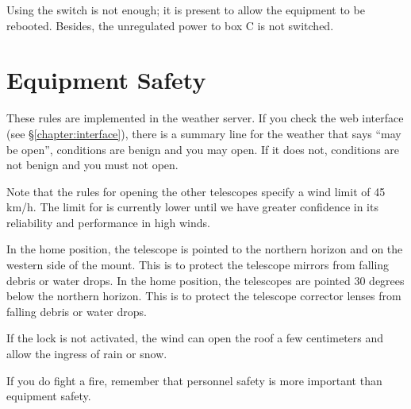 Using the switch is not enough; it is present to allow the equipment to be rebooted. Besides, the unregulated power to box C is not switched.



\section{Equipment Safety}


These rules are implemented in the {\projectname} weather server. If you check the {\projectname} web interface (see \S\ref{chapter:interface}), there is a summary line for the weather that says “may be open”, conditions are benign and you may open. If it does not, conditions are not benign and you must not open.

Note that the rules for opening the other telescopes specify a wind limit of 45 km/h. The limit for {\projectname} is currently lower until we have greater confidence in its reliability and performance in high winds.


\ifcoatli
In the home position, the telescope is pointed to the northern horizon and on the western side of the mount. This is to protect the telescope mirrors from falling debris or water drops.
\fi
\ifddoti
In the home position, the telescopes are pointed 30 degrees below the northern horizon. This is to protect the telescope corrector lenses from falling debris or water drops.
\fi



If the lock is not activated, the wind can open the roof a few centimeters and allow the ingress of rain or snow.


If you do fight a fire, remember that personnel safety is more important than equipment safety.

